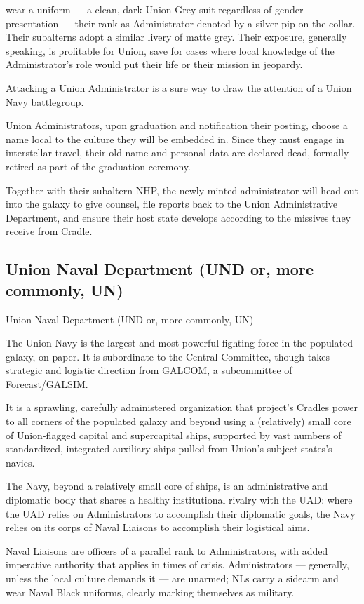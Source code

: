 wear a uniform — a clean, dark Union Grey suit regardless of gender presentation — their rank
as Administrator denoted by a silver pip on the collar. Their subalterns adopt a similar livery of
matte grey. Their exposure, generally speaking, is profitable for Union, save for cases where local
knowledge of the Administrator’s role would put their life or their mission in jeopardy.


Attacking a Union Administrator is a sure way to draw the attention of a Union Navy battlegroup.


Union Administrators, upon graduation and notification their posting, choose a name local to the
culture they will be embedded in. Since they must engage in interstellar travel, their old name
and personal data are declared dead, formally retired as part of the graduation ceremony.


Together with their subaltern NHP, the newly minted administrator will head out into the galaxy to
give counsel, file reports back to the Union Administrative Department, and ensure their host
state develops according to the missives they receive from Cradle.

\subsection{Union Naval Department (UND or, more commonly, UN)}
Union Naval Department (UND or, more commonly, UN)

The Union Navy is the largest and most powerful fighting force in the populated galaxy, on paper.
It is subordinate to the Central Committee, though takes strategic and logistic direction from
GALCOM, a subcommittee of Forecast/GALSIM.


It is a sprawling, carefully administered organization that project’s Cradles power to all corners of
the populated galaxy and beyond using a (relatively) small core of Union-flagged capital and
supercapital ships, supported by vast numbers of standardized, integrated auxiliary ships pulled
from Union’s subject states’s navies.


The Navy, beyond a relatively small core of ships, is an administrative and diplomatic body that
shares a healthy institutional rivalry with the UAD: where the UAD relies on Administrators to
accomplish their diplomatic goals, the Navy relies on its corps of Naval Liaisons to accomplish
their logistical aims.


Naval Liaisons are officers of a parallel rank to Administrators, with added imperative authority
that applies in times of crisis. Administrators — generally, unless the local culture demands it —
are unarmed; NLs carry a sidearm and wear Naval Black uniforms, clearly marking themselves as
military.


